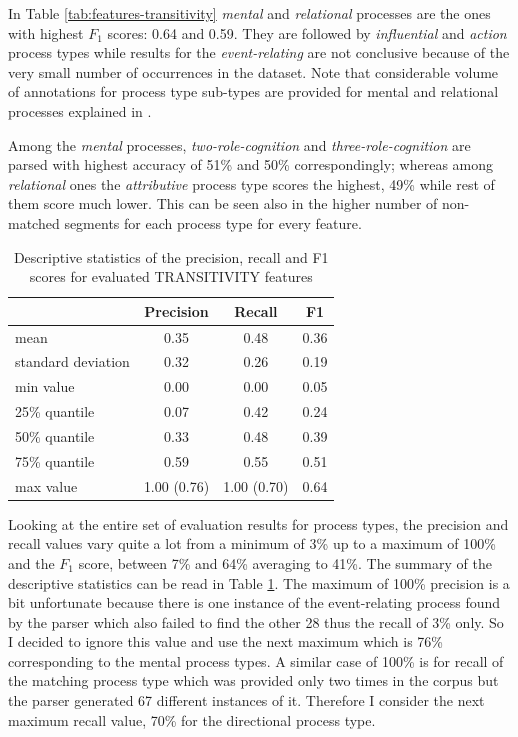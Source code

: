    In Table \ref{tab:features-transitivity} \textit{mental} and \textit{relational} processes are the ones with highest $F_1$ scores: 0.64 and 0.59. They are followed by \textit{influential} and \textit{action} process types while results for the \textit{event-relating} are not conclusive because of the very small number of occurrences in the dataset. 
    Note that considerable volume of annotations for process type sub-types are provided for mental and relational processes explained in \citet[153-155]{schulz2015me}.
    
    Among the \textit{mental} processes, \textit{two-role-cognition} and \textit{three-role-cognition} are parsed with highest accuracy of 51\% and 50\% correspondingly; whereas among \textit{relational} ones the \textit{attributive} process type scores the highest, 49\% while rest of them score much lower. This can be seen also in the higher number of  non-matched segments for each process type for every feature.
    
    \begin{table}[!ht]
    \centering
    \begin{tabular}{lccc}
        \toprule
        {} & {Precision} & {Recall} & {F1} \\ %
        \midrule
        mean & 0.35 & 0.48 & 0.36 \\
        standard deviation & 0.32 & 0.26 & 0.19 \\
        min value & 0.00 & 0.00 & 0.05 \\
        25\% quantile & 0.07 & 0.42 & 0.24 \\
        50\% quantile & 0.33 & 0.48 & 0.39 \\
        75\% quantile & 0.59 & 0.55 & 0.51 \\
        max value & 1.00 (0.76) & 1.00 (0.70) & 0.64 \\
        \bottomrule
    \end{tabular}
    \caption{Descriptive statistics of the precision, recall and F1 scores for evaluated TRANSITIVITY features}
    \label{tab:transitivity-accuracy}
    \end{table}
    
    Looking at the entire set of evaluation results for process types, the precision and recall values vary quite a lot from a minimum of 3\% up to a maximum of 100\% and the $F_1$ score, between 7\% and 64\%  averaging to 41\%. The summary of the descriptive statistics can be read in Table \ref{tab:transitivity-accuracy}. The maximum of 100\% precision is a bit unfortunate because there is one instance of the event-relating process found by the parser which also failed to find the other 28 thus the recall of 3\% only. So I decided to ignore this value and use the next maximum which is 76\% corresponding to the mental process types. A similar case of 100\% is for recall of the matching process type which was provided only two times in the corpus but the parser generated 67 different instances of it. Therefore I consider the next maximum recall value, 70\%  for the directional process type. 
    

